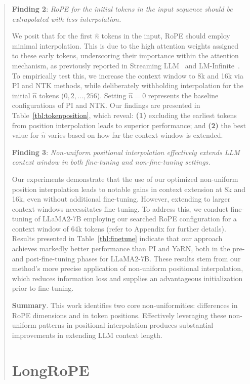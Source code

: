 \begin{abstract}
\textbf{Finding 2}: \textit{RoPE for the initial tokens in the input sequence should be extrapolated with less interpolation.} 

We posit that for the first $\hat{n}$ tokens in the input, RoPE should employ minimal interpolation. This is due to the high attention weights assigned to these early tokens, underscoring their importance within the attention mechanism, as previously reported in Streaming LLM~\cite{streamingllm} and LM-Infinite~\cite{han2023lminfinite}. To empirically test this, we increase the context window to 8k and 16k via PI and NTK methods, while deliberately withholding interpolation for the initial $\hat n$ tokens ($0, 2, \ldots, 256$). Setting $\hat n=0$ represents the baseline configurations of PI and NTK. Our findings are presented in Table~\ref{tbl:tokenposition}, which reveal: \textbf{(1)} excluding the earliest tokens from position interpolation leads to superior performance; and \textbf{(2)} the best value for $\hat n$ varies based on how far the context window is extended.

\textbf{Finding 3}: \textit{Non-uniform positional interpolation effectively extends LLM context window in both fine-tuning and non-fine-tuning settings.} 

Our experiments demonstrate that the use of our optimized non-uniform position interpolation leads to notable gains in context extension at 8k and 16k, even without additional fine-tuning. However, extending to larger context windows necessitates fine-tuning. To address this, we conduct fine-tuning of LLaMA2-7B employing our searched RoPE configuration for a context window of 64k tokens (refer to Appendix for further details). Results presented in Table~\ref{tbl:finetune} indicate that our approach achieves markedly better performance than PI and YaRN, both in the pre- and post-fine-tuning phases for LLaMA2-7B. These results stem from our method’s more precise application of non-uniform positional interpolation, which reduces information loss and supplies an advantageous initialization prior to fine-tuning.

\textbf{Summary}. This work identifies two core non-uniformities: differences in RoPE dimensions and in token positions. Effectively leveraging these non-uniform patterns in positional interpolation produces substantial improvements in extending LLM context length.

\section{LongRoPE}


\end{abstract}
